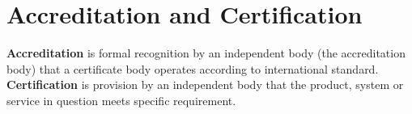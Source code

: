 \documentclass[a4paper,11pt]{article}
\begin{document}
\section{Accreditation and Certification}
\textbf{Accreditation} is formal recognition by an independent body (the accreditation body) that a certificate body operates according to international standard.\\
\textbf{Certification} is provision by an independent body that the product, system or service in question meets specific requirement.
\end{document}

